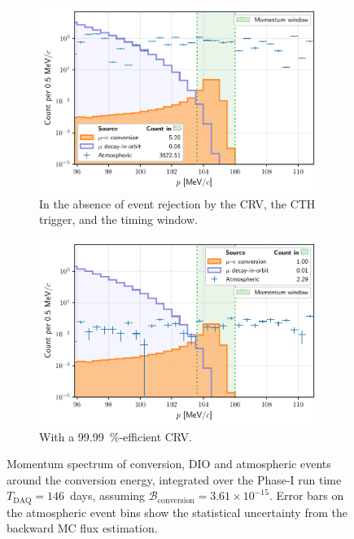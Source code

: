 \begin{figure}
    \centering
        
    \begin{subfigure}[t]{0.49\textwidth}
        \centering
        \includegraphics[width=\textwidth]{chapter6/thesis_conversion_search_momentum_distribution_nocuts_v5.pdf}
        \caption{ In the absence of event rejection by the CRV, the CTH trigger, and the timing window. }
        \label{fig:log_spectrum_nocuts}
    \end{subfigure}
    \hfill
    \begin{subfigure}[t]{0.49\textwidth}
        \centering
        \includegraphics[width=\textwidth]{chapter6/thesis_conversion_search_momentum_distribution_withcuts_except_directionID.pdf}
        \caption{ With a \SI{99.99}{\percent}-efficient CRV. 
        }
        \label{fig:log_spectrum_cuts_except_directionID}
    \end{subfigure}
    \caption{ Momentum spectrum of conversion, DIO and atmospheric events around
    the conversion energy, integrated over the Phase-I run time $T_\mathrm{DAQ}
    = 146$~days, assuming $\mathcal{B}_\mathrm{conversion} = 3.61\times
    10^{-15}$. Error bars on the atmospheric event bins show the statistical
    uncertainty from the backward MC flux estimation.
    }
    \label{fig:log_spectra}
\end{figure}



